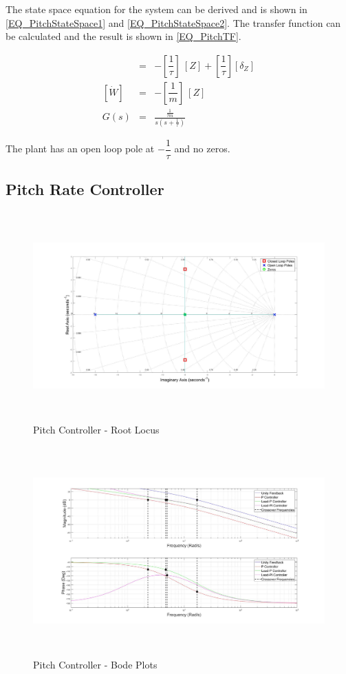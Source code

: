 	 The state space equation for the system can be derived and is shown in \eqref{EQ_PitchStateSpace1} and \eqref{EQ_PitchStateSpace2}. The transfer function can be calculated and the result is shown in \eqref{EQ_PitchTF}.
	 
	 \begin{eqnarray}
	 [\dot{Z}] &=& - [\dfrac{1}{\tau}] \ [Z] + [\dfrac{1}{\tau}] [\delta_Z]\\\label{EQ_PitchStateSpace1}
	 [\dot{W}] &=& - [\dfrac{1}{m}] \ [Z]\label{EQ_PitchStateSpace2}\\
	 G(s) &=& \frac{\frac{1}{\tau m}}{s (s + \frac{1}{\tau})}\label{EQ_PitchTF}
	 \end{eqnarray}
	 
	 The plant has an open loop pole at $-\dfrac{1}{\tau}$ and no zeros.
	 
	 \subsection{Pitch Rate Controller}	
		
		\begin{figure}[H]
			\centering
			\includegraphics[height = 8cm]{../Design/Matlab/Controllers/pitch_rate_root.jpg}
			\caption{Pitch Controller -  Root Locus}
			\label{IM_PitchControlRoot}
		\end{figure}
		
		\begin{figure}[H]
			\centering
			\includegraphics[height = 8cm]{../Design/Matlab/Controllers/pitch_rate_bode.jpg}
			\caption{Pitch Controller -  Bode Plots}
			\label{IM_PitchControlBode}
		\end{figure}
		
